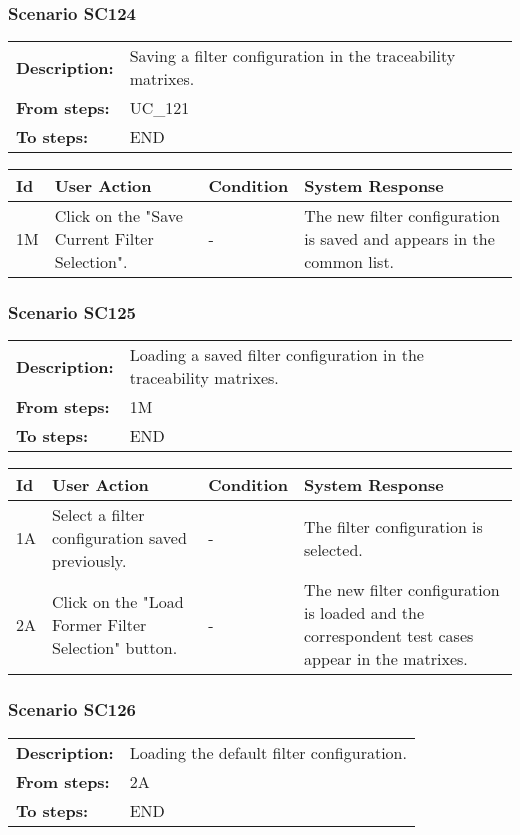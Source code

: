 \documentclass[a4paper,11pt]{article}
\newcommand{\bl}{\\ \hline}
\begin{document}
\subsubsection*{Scenario SC124}
\begin{tabular}{p{1in}p{4in}}
{\bf Description:} & Saving a filter configuration in the traceability
					matrixes. \\
{\bf From steps:} & UC_121#2A \\
{\bf To steps:} & END \\
\end{tabular}
 
\begin{tabular}{|p{0.8in}|p{1.6in}|p{1.6in}|p{1.6in}|}
\hline
Id & User Action & Condition & System Response  \bl 
1M & Click on the "Save Current Filter Selection". & - & The new filter configuration is saved and appears in the
						common list. \bl 
\end{tabular}
\subsubsection*{Scenario SC125}
\begin{tabular}{p{1in}p{4in}}
{\bf Description:} & Loading a saved filter configuration in the
					traceability matrixes. \\
{\bf From steps:} & 1M \\
{\bf To steps:} & END \\
\end{tabular}
 
\begin{tabular}{|p{0.8in}|p{1.6in}|p{1.6in}|p{1.6in}|}
\hline
Id & User Action & Condition & System Response  \bl 
1A & Select a filter configuration saved previously. & - & The filter configuration is selected. \bl 
2A & Click on the "Load Former Filter Selection" button.
					 & - & The new filter configuration is loaded and the
						correspondent test cases appear in the matrixes. \bl 
\end{tabular}
\subsubsection*{Scenario SC126}
\begin{tabular}{p{1in}p{4in}}
{\bf Description:} & Loading the default filter configuration. \\
{\bf From steps:} & 2A \\
{\bf To steps:} & END \\
\end{tabular}
 
\end{document}
